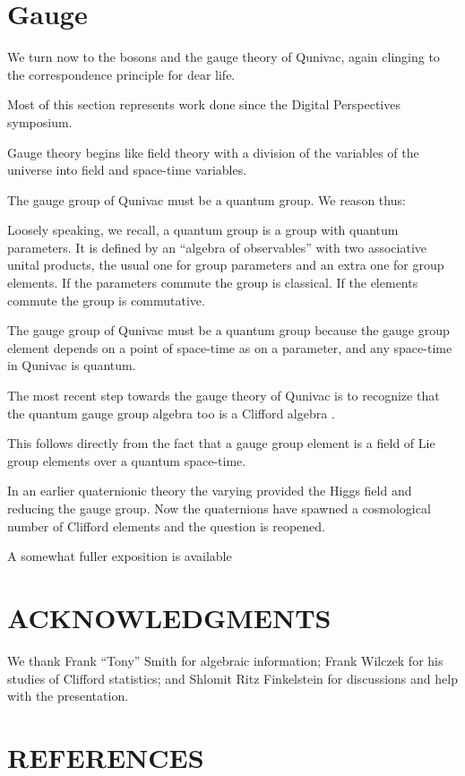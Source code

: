 \documentclass[a4paper,11pt]{article}
\begin{document}
\section{Gauge}

We turn now to the bosons
and 
the gauge theory of Qunivac,
again clinging to the correspondence principle
for dear life.

Most of this section represents work
done since the Digital Perspectives symposium.

Gauge theory begins like field theory
with a division of the variables of the universe
into field and space-time variables.

The gauge group of Qunivac must be a quantum group.
We reason thus:

Loosely speaking, we recall,
a quantum group 
is a group with quantum parameters.
It is defined by an ``algebra of observables''
with two associative unital products,
the usual one for  group 
parameters
 \cite{FINKELSTEIN1996}
and an extra one for group elements.
If the parameters commute the group is classical.
If the elements commute
the group is commutative.

The gauge group of Qunivac must be a quantum group
because
 the gauge group element
depends on a point of space-time as on a parameter,
and any space-time in Qunivac is quantum.

The most recent step towards
the gauge theory of Qunivac
is to recognize that the quantum gauge group algebra
too is a Clifford algebra \coordHE{}.

This follows directly from the fact
that a gauge group element
is a field of Lie group elements
over a quantum space-time.

In an earlier quaternionic theory
the varying  \coordHE{}
provided the Higgs field
and reducing the gauge group.
Now  the quaternions
have spawned 
a cosmological number of Clifford elements
and the question is reopened.

A somewhat fuller exposition
is available \cite{BAUGH02}

\section{ACKNOWLEDGMENTS}
We thank 
Frank ``Tony'' Smith for algebraic information;
Frank Wilczek for his  studies of Clifford statistics;
and Shlomit Ritz Finkelstein
for discussions and help with the presentation.


\section{REFERENCES}
\end{document}
